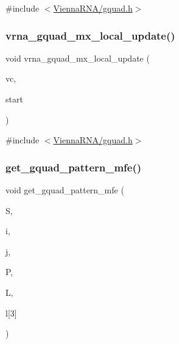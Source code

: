 {\ttfamily \#include $<$\mbox{\hyperlink{gquad_8h}{Vienna\+R\+N\+A/gquad.\+h}}$>$}

\mbox{\label{group__gquads_gad09a24800f11f53c2dbc65b945ec956e}} 
\subsubsection{\texorpdfstring{vrna\+\_\+gquad\+\_\+mx\+\_\+local\+\_\+update()}{vrna\_gquad\_mx\_local\_update()}}
{\footnotesize\ttfamily void vrna\+\_\+gquad\+\_\+mx\+\_\+local\+\_\+update (\begin{DoxyParamCaption}\item[{\mbox{\hyperlink{group__fold__compound_ga1b0cef17fd40466cef5968eaeeff6166}{vrna\+\_\+fold\+\_\+compound\+\_\+t}} $\ast$}]{vc,  }\item[{int}]{start }\end{DoxyParamCaption})}



{\ttfamily \#include $<$\mbox{\hyperlink{gquad_8h}{Vienna\+R\+N\+A/gquad.\+h}}$>$}

\mbox{\label{group__gquads_ga4be64833bd2692a91c7454bb8f17c622}} 
\subsubsection{\texorpdfstring{get\+\_\+gquad\+\_\+pattern\+\_\+mfe()}{get\_gquad\_pattern\_mfe()}}
{\footnotesize\ttfamily void get\+\_\+gquad\+\_\+pattern\+\_\+mfe (\begin{DoxyParamCaption}\item[{short $\ast$}]{S,  }\item[{int}]{i,  }\item[{int}]{j,  }\item[{\mbox{\hyperlink{group__energy__parameters_ga8a69ca7d787e4fd6079914f5343a1f35}{vrna\+\_\+param\+\_\+t}} $\ast$}]{P,  }\item[{int $\ast$}]{L,  }\item[{int}]{l\mbox{[}3\mbox{]} }\end{DoxyParamCaption})}



